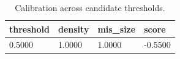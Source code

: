 \begin{table}[htbp]
\centering
\begin{tabular}{llll}
\hline
threshold & density & mis_size & score \\
\hline
0.5000 & 1.0000 & 1.0000 & -0.5500 \\
\hline
\end{tabular}
\caption{Calibration across candidate thresholds.}
\label{table_graph_calibration}
\end{table}